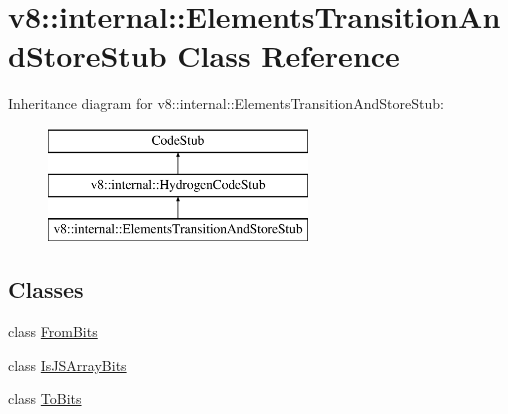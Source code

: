 \hypertarget{classv8_1_1internal_1_1_elements_transition_and_store_stub}{}\section{v8\+:\+:internal\+:\+:Elements\+Transition\+And\+Store\+Stub Class Reference}
\label{classv8_1_1internal_1_1_elements_transition_and_store_stub}
Inheritance diagram for v8\+:\+:internal\+:\+:Elements\+Transition\+And\+Store\+Stub\+:\begin{figure}[H]
\begin{center}
\leavevmode
\includegraphics[height=3.000000cm]{classv8_1_1internal_1_1_elements_transition_and_store_stub}
\end{center}
\end{figure}
\subsection*{Classes}
\begin{DoxyCompactItemize}
\item 
class \hyperlink{classv8_1_1internal_1_1_elements_transition_and_store_stub_1_1_from_bits}{From\+Bits}
\item 
class \hyperlink{classv8_1_1internal_1_1_elements_transition_and_store_stub_1_1_is_j_s_array_bits}{Is\+J\+S\+Array\+Bits}
\item 
class \hyperlink{classv8_1_1internal_1_1_elements_transition_and_store_stub_1_1_to_bits}{To\+Bits}
\end{DoxyCompactItemize}
